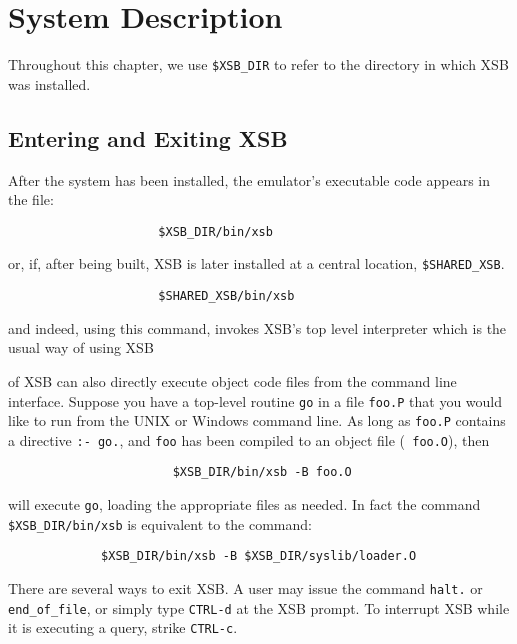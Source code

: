 \chapter{System Description}
\label{system}

Throughout this chapter, we use \verb'$XSB_DIR' to refer to the
directory in which XSB was installed.

\section{Entering and Exiting XSB}

After the system has been installed, the emulator's executable code appears 
in the file:
\begin{verbatim}
                     $XSB_DIR/bin/xsb
\end{verbatim}
or, if, after being built, XSB is later installed  at a central location,
\verb'$SHARED_XSB'.
\begin{verbatim}
                     $SHARED_XSB/bin/xsb
\end{verbatim}
and indeed, using this command, invokes XSB's top level interpreter
which is the usual way of
using XSB

\version{} of XSB can also directly execute object code files from the
command line interface.  Suppose you have a top-level routine {\tt go}
in a file {\tt foo.P} that you would like to run from the UNIX or
Windows command line.  As long as {\tt foo.P} contains a directive
{\tt :- go.}, and {\tt foo} has been compiled to an object file ({\tt
foo.O}), then
\begin{verbatim}
                       $XSB_DIR/bin/xsb -B foo.O
\end{verbatim}
will execute {\tt go}, loading the appropriate files as needed.  In
fact the command \verb'$XSB_DIR/bin/xsb' is equivalent to the
command:
\begin{verbatim}
             $XSB_DIR/bin/xsb -B $XSB_DIR/syslib/loader.O
\end{verbatim}

There are several ways to exit XSB.  A user may issue the
command \verb'halt.' or \verb'end_of_file', or simply type
\verb'CTRL-d' at the XSB prompt.  To interrupt XSB
while it is executing a query, strike \verb'CTRL-c'.



